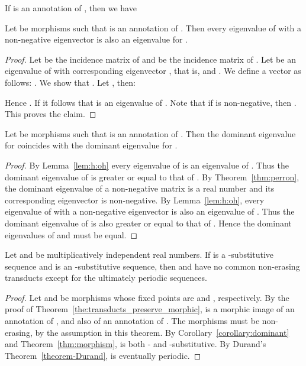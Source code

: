 If  is an annotation of , then we have 


\begin{lemma}\label{lem:oh:h}
  Let  be morphisms such that 
  is an annotation of .
  Then every eigenvalue of  with a non-negative eigenvector is also an eigenvalue for .
\end{lemma}

\begin{proof}
  Let  be the incidence matrix of 
  and  be the incidence matrix of .
  Let  be an eigenvalue of  with corresponding eigenvector ,
  that is,  and .
  We define a vector  as follows:
  .
  We show that .
  Let , then:
    
  Hence .
  If  it follows that  is an eigenvalue of .
  Note that if  is non-negative, then . This proves the claim.
\end{proof}

\begin{corollary}\label{corollary:dominant}
  Let  be morphisms such that 
  is an annotation of .
  Then the dominant eigenvalue for  coincides with the dominant eigenvalue for .
\end{corollary}

\begin{proof}
  By Lemma~\ref{lem:h:oh} every eigenvalue of  is an eigenvalue of .
  Thus the dominant eigenvalue of  is greater or equal to that of .
  By Theorem~\ref{thm:perron}, the dominant eigenvalue of a non-negative matrix is a real number 
  and its corresponding eigenvector is non-negative.
  By Lemma~\ref{lem:h:oh}, every eigenvalue of  with a non-negative eigenvector is also an eigenvalue of . 
  Thus the dominant eigenvalue of  is also greater or equal to that of .
  Hence the dominant eigenvalues of  and  must be equal.
\end{proof}




\begin{theorem}
  Let  and  be  multiplicatively independent real numbers.
 If  is a -substitutive sequence and  is an -substitutive sequence,
  then  and  have
 no common non-erasing transducts except for the ultimately periodic sequences. 
\label{theorem-apply-Durand}
\end{theorem}

\begin{proof} 
Let  and  be morphisms whose fixed points are  and , respectively.
  By the proof of Theorem~\ref{the:transducts_preserve_morphic}, 
   is a morphic image of an annotation   
  of , and also of an annotation  of .  
  The morphisms must be non-erasing, by the assumption in this theorem.
By  Corollary~\ref{corollary:dominant} and Theorem~\ref{thm:morphism}, 
   is both - and -substitutive.
  By Durand's Theorem~\ref{theorem-Durand},  is eventually periodic.
\end{proof}


